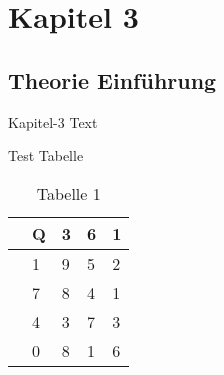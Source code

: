 \chapter{Kapitel 3}

\section{Theorie Einführung}
Kapitel-3 Text

Test Tabelle

\begin{table}[H]
\centering
\begin{tabular}{|l|l|l|l|l|}
\hline
      & Q & 3 & 6 & 1 \\ \hline
      & 1 & 9 & 5 & 2 \\ \hline
      & 7 & 8 & 4 & 1 \\ \hline
      & 4 & 3 & 7 & 3 \\ \hline
      & 0 & 8 & 1 & 6 \\ \hline
\end{tabular}
\caption{Tabelle 1}
\end{table}